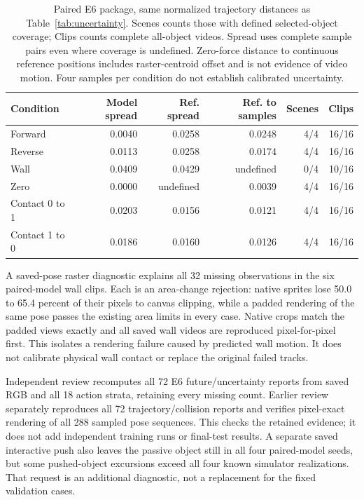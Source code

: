 \documentclass[11pt,a4paper]{article}
\begin{document}
\begin{table}[!ht]
\centering
\begin{tabular}{lrrrrr}
\hline
Condition & Model spread & Ref. spread & Ref. to samples & Scenes & Clips \\
\hline
Forward & 0.0040 & 0.0258 & 0.0248 & 4/4 & 16/16 \\
Reverse & 0.0113 & 0.0258 & 0.0174 & 4/4 & 16/16 \\
Wall & 0.0409 & 0.0429 & undefined & 0/4 & 10/16 \\
Zero & 0.0000 & undefined & 0.0039 & 4/4 & 16/16 \\
Contact 0 to 1 & 0.0203 & 0.0156 & 0.0121 & 4/4 & 16/16 \\
Contact 1 to 0 & 0.0186 & 0.0160 & 0.0126 & 4/4 & 16/16 \\
\hline
\end{tabular}
\caption{Paired E6 package, same normalized trajectory distances as Table~\ref{tab:uncertainty}. Scenes counts those with defined selected-object coverage; Clips counts complete all-object videos. Spread uses complete sample pairs even where coverage is undefined. Zero-force distance to continuous reference positions includes raster-centroid offset and is not evidence of video motion. Four samples per condition do not establish calibrated uncertainty.}
\label{tab:contact_uncertainty}
\end{table}

A saved-pose raster diagnostic explains all 32 missing observations in the six paired-model wall clips. Each is an area-change rejection: native sprites lose 50.0 to 65.4 percent of their pixels to canvas clipping, while a padded rendering of the same pose passes the existing area limits in every case. Native crops match the padded views exactly and all saved wall videos are reproduced pixel-for-pixel first. This isolates a rendering failure caused by predicted wall motion. It does not calibrate physical wall contact or replace the original failed tracks.

Independent review recomputes all 72 E6 future/uncertainty reports from saved RGB and all 18 action strata, retaining every missing count. Earlier review separately reproduces all 72 trajectory/collision reports and verifies pixel-exact rendering of all 288 sampled pose sequences. This checks the retained evidence; it does not add independent training runs or final-test results. A separate saved interactive push also leaves the passive object still in all four paired-model seeds, but some pushed-object excursions exceed all four known simulator realizations. That request is an additional diagnostic, not a replacement for the fixed validation cases.
\end{document}
